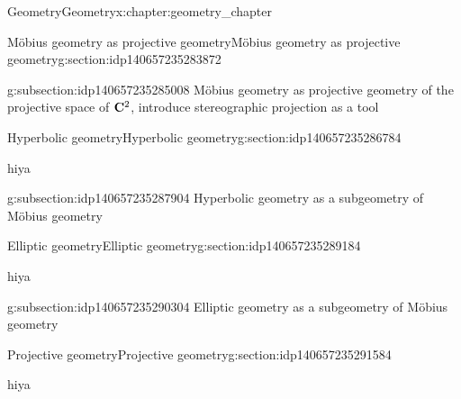 \documentclass[oneside,10pt,]{book}
\numberwithin{equation}{section}
\newcommand{\C}{{\rm \bf C}}
\begin{document}
\begin{chapterptx}{Geometry}{}{Geometry}{}{}{x:chapter:geometry_chapter}
\begin{sectionptx}{Möbius geometry as projective geometry}{}{Möbius geometry as projective geometry}{}{}{g:section:idp140657235283872}
\typeout{************************************************}
%
\begin{subsectionptx}{}{}{}{}{}{g:subsection:idp140657235285008}
Möbius geometry as projective geometry of the projective space of \(\C^2\), introduce stereographic projection as a tool%
\end{subsectionptx}
\end{sectionptx}
%
%
\typeout{************************************************}
\typeout{************************************************}
%
\begin{sectionptx}{Hyperbolic geometry}{}{Hyperbolic geometry}{}{}{g:section:idp140657235286784}
\begin{introduction}{}%
hiya\end{introduction}%
%
%
\typeout{************************************************}
\typeout{************************************************}
%
\begin{subsectionptx}{}{}{}{}{}{g:subsection:idp140657235287904}
Hyperbolic geometry as a subgeometry of Möbius geometry%
\end{subsectionptx}
\end{sectionptx}
%
%
\typeout{************************************************}
\typeout{************************************************}
%
\begin{sectionptx}{Elliptic geometry}{}{Elliptic geometry}{}{}{g:section:idp140657235289184}
\begin{introduction}{}%
hiya\end{introduction}%
%
%
\typeout{************************************************}
\typeout{************************************************}
%
\begin{subsectionptx}{}{}{}{}{}{g:subsection:idp140657235290304}
Elliptic geometry as a subgeometry of Möbius geometry%
\end{subsectionptx}
\end{sectionptx}
%
%
\typeout{************************************************}
\typeout{************************************************}
%
\begin{sectionptx}{Projective geometry}{}{Projective geometry}{}{}{g:section:idp140657235291584}
\begin{introduction}{}%
hiya\end{introduction}%
%
%
\typeout{************************************************}

\end{sectionptx}
\end{chapterptx}
\end{document}
